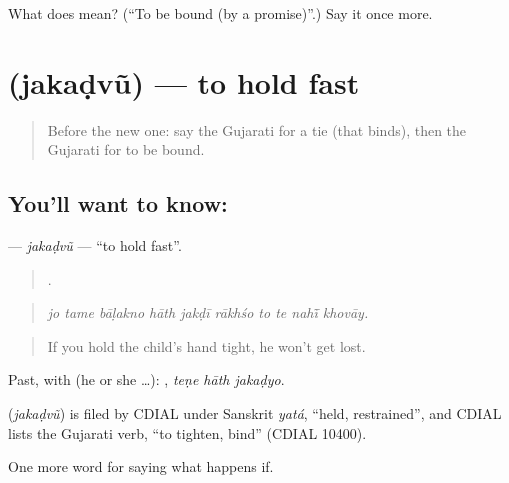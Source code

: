 \begin{tcolorbox}[breakable,colback=teal!4,colframe=teal!35!black,title={Before you move on}]
What does  mean? (\textquotedblleft{}To be bound (by a promise)\textquotedblright{}.) Say it once more.
\end{tcolorbox}
\section[\texorpdfstring{\gu{જકડવું} (jakaḍvũ)}{જકડવું (jakaḍvũ)}]{ (jakaḍvũ) — to hold fast}

\label{lesson:GU-C540-jakadvu}



\begin{quote}
Before the new one: say the Gujarati for a tie (that binds), then the Gujarati for to be bound.
\end{quote}

\subsection*{You'll want to know: }
\textbf{} — \emph{jakaḍvũ} — \textquotedblleft{}to hold fast\textquotedblright{}.

\begin{quote}
         .
\end{quote}

\begin{quote}
\emph{jo tame bāḷakno hāth jakḍī rākhśo to te nahī̃ khovāy.}
\end{quote}

\begin{quote}
If you hold the child's hand tight, he won't get lost.
\end{quote}

Past, with  (he or she …):   , \emph{teṇe hāth jakaḍyo}.

\begin{cousinweb}
\textbf{} (\emph{jakaḍvũ}) is filed by CDIAL under Sanskrit \emph{yatá}, \textquotedblleft{}held, restrained\textquotedblright{}, and CDIAL lists the Gujarati verb, \textquotedblleft{}to tighten, bind\textquotedblright{} (CDIAL 10400).
\end{cousinweb}

\begin{grammarlens}[title={What you've built}]
One more word for saying what happens if.
\end{grammarlens}

